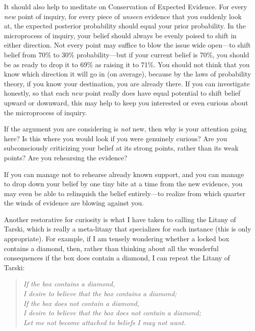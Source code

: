 {
 It should also help to meditate on Conservation of Expected
Evidence. For every \textit{new} point of inquiry, for every piece of
\textit{unseen} evidence that you suddenly look at, the expected
posterior probability should equal your prior probability. In the
microprocess of inquiry, your belief should always be evenly poised to
shift in either direction. Not every point may suffice to blow the
issue wide open---to shift belief from 70\% to 30\% probability---but
if your current belief is 70\%, you should be as ready to drop it to
69\% as raising it to 71\%. You should not think that you know which
direction it will go in (on average), because by the laws of
probability theory, if you know your destination, you are already
there. If you can investigate honestly, so that each \textit{new} point
really does have equal potential to shift belief upward or downward,
this may help to keep you interested or even curious about the
microprocess of inquiry.}

{
 If the argument you are considering is \textit{not} new, then why
is your attention going here? Is this where you would look if you were
genuinely curious? Are you subconsciously criticizing your belief at
its strong points, rather than its weak points? Are you rehearsing the
evidence?}

{
 If you can manage not to rehearse already known support, and you
can manage to drop down your belief by one tiny bite at a time from the
new evidence, you may even be able to relinquish the belief
entirely---to realize from which quarter the winds of evidence are
blowing against you.}

{
 Another restorative for curiosity is what I have taken to calling
the Litany of Tarski, which is really a meta-litany that specializes
for each instance (this is only appropriate). For example, if I am
tensely wondering whether a locked box contains a diamond, then, rather
than thinking about all the wonderful consequences if the box does
contain a diamond, I can repeat the Litany of Tarski:}

\begin{verse}
\textit{If the box contains a diamond,}\\
\textit{ I desire to believe that the box contains a diamond;}\\
\textit{ If the box does not contain a diamond,}\\
\textit{ I desire to believe that the box does not contain a
diamond;}\\
\textit{ Let me not become attached to beliefs I may not want.}\\
\end{verse}

